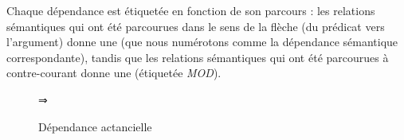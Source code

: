 Chaque dépendance est étiquetée en fonction de son parcours : les relations sémantiques qui ont été parcourues dans le sens de la flèche (du prédicat vers l’argument) donne une  (que nous numérotons comme la dépendance sémantique correspondante), tandis que les relations sémantiques qui ont été parcourues à contre-courant donne une  (étiquetée \textit{MOD}).

\begin{figure}
\begin{minipage}[c]{.15\textwidth}\centering%
\end{minipage}
\begin{minipage}[c]{.1\textwidth}\centering⇒\end{minipage}
\begin{minipage}[c]{.15\textwidth}\centering%
\end{minipage}
\caption{Dépendance actancielle} 
\end{figure}

